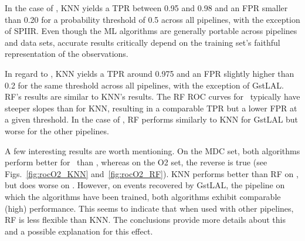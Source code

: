 In the case of \hasns, \ac{KNN} yields a \ac{TPR} between 0.95 and 0.98 and an \ac{FPR} smaller than 0.20 for a probability threshold of 0.5 across all pipelines, with the exception of
SPIIR.  Even though the \ac{ML}
algorithms are generally portable across pipelines and data sets, accurate results critically depend on the training set's faithful representation of the observations.  

In regard to
\hasrem, \ac{KNN} yields a \ac{TPR} around 0.975 and an \ac{FPR} slightly higher than 0.2 for the same threshold across all pipelines, with the exception of GstLAL. \ac{RF}'s results are
similar to \ac{KNN}'s results. The \ac{RF} \ac{ROC} curves for \hasns\ typically have steeper slopes than for \ac{KNN}, resulting in a comparable \ac{TPR} but a lower \ac{FPR} at a given
threshold. In the case of \hasrem, \ac{RF} performs similarly to \ac{KNN} for GstLAL but worse for the other pipelines.

A few interesting results are worth mentioning.  On the \ac{MDC} set, both algorithms perform better for \hasns\ than \hasrem, whereas on the \ac{O2} set, the reverse is true (see
Figs.~\ref{fig:rocO2_KNN} and~\ref{fig:rocO2_RF}). \ac{KNN} performs better than \ac{RF} on \hasrem, but does worse on \hasns. However, on events recovered by GstLAL, the pipeline on
which the algorithms have been trained, both algorithms exhibit comparable (high) performance. This seems to indicate that when used with other pipelines, \ac{RF} is less flexible than
\ac{KNN}. The conclusions provide more details about this and a possible explanation for this effect.

